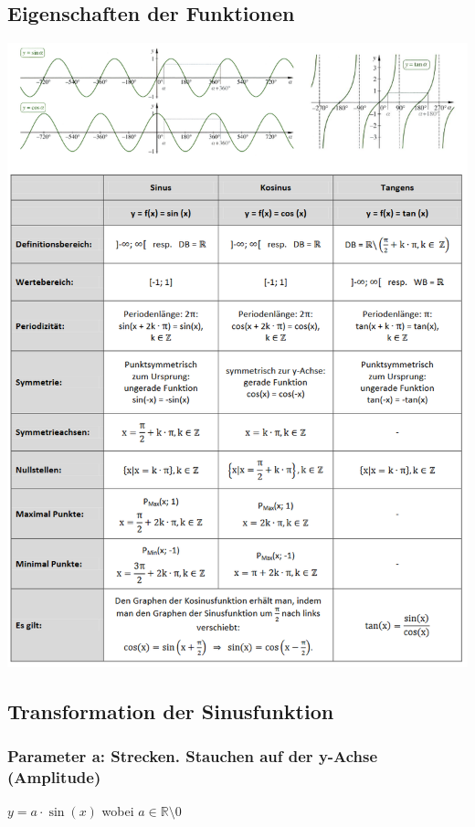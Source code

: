 \subsection{Eigenschaften der Funktionen}
\includegraphics[scale=0.7]{trigfunktionen.PNG}

\subsection{Transformation der Sinusfunktion}
\subsubsection{Parameter a: Strecken. Stauchen auf der y-Achse (Amplitude)}
$y = a \cdot \sin(x)$ wobei $a \in \mathbb{R}\setminus0$ \\

